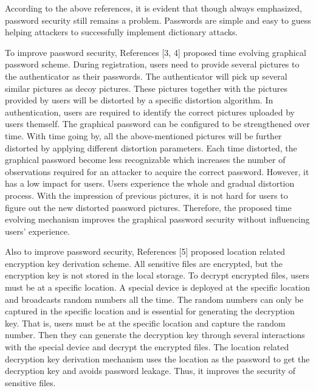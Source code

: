 According to the above references, it is evident that though always emphasized, password security still remains a problem. Passwords are simple and easy to guess helping attackers to successfully implement dictionary attacks. 

To improve password security, References [3, 4] proposed time evolving graphical password scheme. During registration, users need to provide several pictures to the authenticator as their passwords. The authenticator will pick up several similar pictures as decoy pictures. These pictures together with the pictures provided by users will be distorted by a specific distortion algorithm. In authentication, users are required to identify the correct pictures uploaded by users themself. The graphical password can be configured to be strengthened over time. With time going by, all the above-mentioned pictures will be further distorted by applying different distortion parameters. Each time distorted, the graphical password become less recognizable which increases the number of observations required for an attacker to acquire the correct password. However, it has a low impact for users. Users experience the whole and gradual distortion process. With the impression of previous pictures, it is not hard for users to figure out the new distorted password pictures. Therefore, the proposed time evolving mechanism improves the graphical password security without influencing users’ experience. 

Also to improve password security, References [5] proposed location related encryption key derivation scheme. All sensitive files are encrypted, but the encryption key is not stored in the local storage. To decrypt encrypted files, users must be at a specific location. A special device is deployed at the specific location and broadcasts random numbers all the time. The random numbers can only be captured in the specific location and is essential for generating the decryption key. That is, users must be at the specific location and capture the random number. Then they can generate the decryption key through several interactions with the special device and decrypt the encrypted files. The location related decryption key derivation mechanism uses the location as the password to get the decryption key and avoids password leakage. Thus, it improves the security of sensitive files. 
